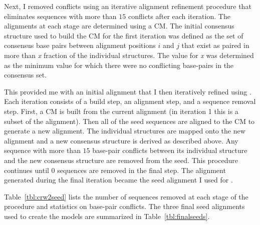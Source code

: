 Next, I removed conflicts using an iterative alignment refinement
procedure that eliminates sequences with more than $15$ conflicts after
each iteration. The alignments at each stage are determined using a
CM\@. The initial consensus structure used to build the CM for the first
iteration was defined as the set of consensus base pairs between
alignment positions $i$ and $j$ that exist as paired in more than
\emph{x} fraction of the individual structures. The value for \emph{x}
was determined as the minimum value for which there were no
conflicting base-pairs in the consensus set.

This provided me with an initial alignment that I then iteratively
refined using . Each iteration consists of a build
step, an alignment step, and a sequence removal step. First, a CM is
built from the current alignment (in iteration 1 this is a subset of
the  alignment). Then all of the seed sequences are aligned to the
CM to generate a new alignment. The individual structures are mapped
onto the new alignment and a new consensus structure is derived as
described above.  Any sequence with more than $15$ base-pair conflicts
between its individual structure and the new consensus structure are
removed from the seed.  This procedure continues until 0 sequences are
removed in the final step. The alignment generated during the final
iteration became the seed alignment I used for .

Table~\ref{tbl:crw2seed} lists the number of sequences removed at each
stage of the procedure and statistics on base-pair conflicts. 
The three final seed alignments used to create the  
models are summarized in Table~\ref{tbl:finalseeds}.


